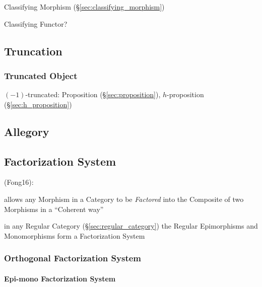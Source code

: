 Classifying Morphism (\S\ref{sec:classifying_morphism})

Classifying Functor?



\subsection{Truncation}\label{sec:truncation}

\subsubsection{Truncated Object}\label{sec:truncated_object}

$(-1)$-truncated: Proposition (\S\ref{sec:proposition}),
$h$-proposition (\S\ref{sec:h_proposition})



\subsection{Allegory}\label{sec:allegory}

\subsection{Factorization System}\label{sec:factorization_system}

(Fong16):

allows any Morphism in a Category to be \emph{Factored} into the
Composite of two Morphisms in a ``Coherent way'' %

in any Regular Category (\S\ref{sec:regular_category}) the Regular
Epimorphisms and Monomorphisms form a Factorization System



\subsubsection{Orthogonal Factorization System}
\label{sec:orthogonal_factorization_system}

\paragraph{Epi-mono Factorization System}
\label{sec:epimono_factorization}\hfill

